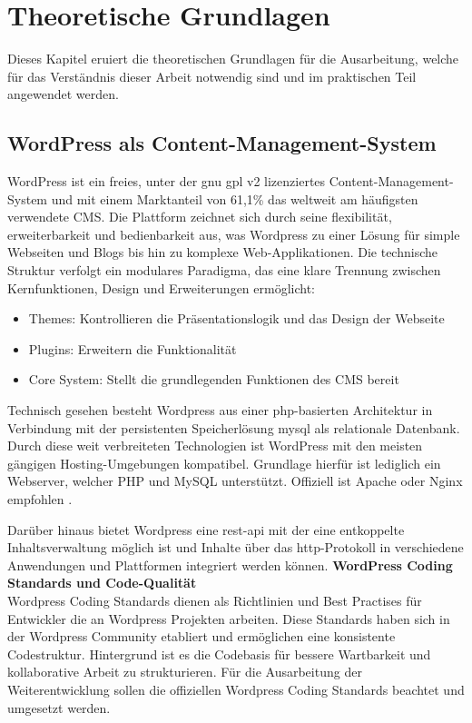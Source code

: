 \chapter{Theoretische Grundlagen}
Dieses Kapitel eruiert die theoretischen Grundlagen für die Ausarbeitung, welche für das Verständnis dieser Arbeit notwendig sind und im praktischen Teil angewendet werden.
\section{WordPress als Content-Management-System}
WordPress ist ein freies, unter der \gls{gnu} \gls{gpl} v2 lizenziertes Content-Management-System und mit einem Marktanteil von 61,1\% das weltweit am häufigsten verwendete CMS. \cite{statista2025cms}
Die Plattform zeichnet sich durch seine flexibilität, erweiterbarkeit und bedienbarkeit aus, was Wordpress zu einer Lösung für simple Webseiten und Blogs bis hin zu komplexe Web-Applikationen. \cite{patel2019review}
Die technische Struktur verfolgt ein modulares Paradigma, das eine klare Trennung zwischen Kernfunktionen, Design und Erweiterungen ermöglicht:
\begin{itemize}

 \item Themes: Kontrollieren die Präsentationslogik und das Design der Webseite

 \item Plugins: Erweitern die Funktionalität

 \item Core System: Stellt die grundlegenden Funktionen des CMS bereit

\end{itemize}
Technisch gesehen besteht Wordpress aus einer \gls{php}-basierten Architektur in Verbindung mit der persistenten Speicherlösung \gls{mysql} als relationale Datenbank.
Durch diese weit verbreiteten Technologien ist WordPress mit den meisten gängigen Hosting-Umgebungen kompatibel.
Grundlage hierfür ist lediglich ein Webserver, welcher PHP und MySQL unterstützt.
Offiziell ist Apache oder Nginx empfohlen \cite{wordpress2024requirements}.

Darüber hinaus bietet Wordpress eine \gls{rest}-\gls{api} mit der eine entkoppelte Inhaltsverwaltung möglich ist und Inhalte über das \gls{http}-Protokoll in verschiedene Anwendungen und Plattformen integriert werden können.
\newpage
\textbf{WordPress Coding Standards und Code-Qualität}\\
Wordpress Coding Standards dienen als Richtlinien und Best Practises für Entwickler die an Wordpress Projekten arbeiten.
Diese Standards haben sich in der Wordpress Community etabliert und ermöglichen eine konsistente Codestruktur.
Hintergrund ist es die Codebasis für bessere Wartbarkeit und kollaborative Arbeit zu strukturieren.
Für die Ausarbeitung der Weiterentwicklung sollen die offiziellen Wordpress Coding Standards beachtet und umgesetzt werden.


